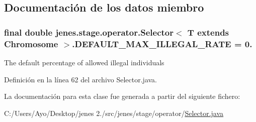 \subsection{Documentación de los datos miembro}
\hypertarget{classjenes_1_1stage_1_1operator_1_1_selector_3_01_t_01extends_01_chromosome_01_4_a81263464a18d2ee1ecddf41f2e97fd89}{
\subsubsection[{D\-E\-F\-A\-U\-L\-T\-\_\-\-M\-A\-X\-\_\-\-I\-L\-L\-E\-G\-A\-L\-\_\-\-R\-A\-T\-E}]{\setlength{\rightskip}{0pt plus 5cm}final double jenes.\-stage.\-operator.\-Selector$<$ T extends Chromosome $>$.D\-E\-F\-A\-U\-L\-T\-\_\-\-M\-A\-X\-\_\-\-I\-L\-L\-E\-G\-A\-L\-\_\-\-R\-A\-T\-E = 0.\hspace{0.3cm}{\ttfamily [static]}}}\label{classjenes_1_1stage_1_1operator_1_1_selector_3_01_t_01extends_01_chromosome_01_4_a81263464a18d2ee1ecddf41f2e97fd89}
The default percentage of allowed illegal individuals 

Definición en la línea 62 del archivo Selector.\-java.



La documentación para esta clase fue generada a partir del siguiente fichero\-:\begin{DoxyCompactItemize}
\item 
C\-:/\-Users/\-Ayo/\-Desktop/jenes 2./src/jenes/stage/operator/\hyperlink{_selector_8java}{Selector.\-java}\end{DoxyCompactItemize}
